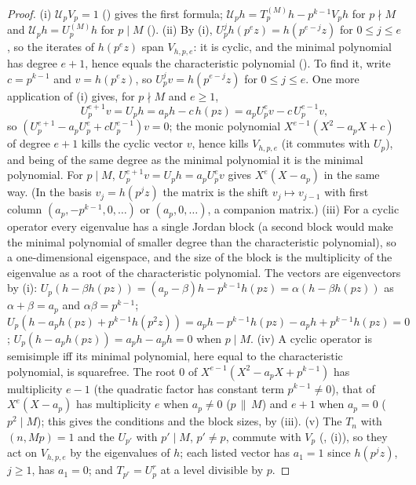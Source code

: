 \begin{proof}
(i) $\mathcal U_pV_p=1$ () gives the first formula; $\mathcal U_ph=T_p^{(M)}h-p^{k-1}V_ph$ for $p\nmid M$ and $\mathcal U_ph=U_p^{(M)}h$ for $p\mid M$ ().
(ii) By (i), $U_p^jh(p^ez)=h(p^{e-j}z)$ for $0\le j\le e$, so the iterates of $h(p^ez)$ span $V_{h,p,e}$: it is cyclic, and the minimal polynomial has degree $e+1$, hence equals the
characteristic polynomial (). To find it, write $c=p^{k-1}$ and $v=h(p^ez)$, so $U_p^jv=h(p^{e-j}z)$ for $0\le j\le e$. One more application of (i) gives, for
$p\nmid M$ and $e\ge1$,
\[
U_p^{e+1}v=U_ph=a_ph-c\,h(pz)=a_pU_p^ev-c\,U_p^{e-1}v,
\]
so $(U_p^{e+1}-a_pU_p^e+cU_p^{e-1})v=0$; the monic polynomial $X^{e-1}(X^2-a_pX+c)$ of degree $e+1$ kills the cyclic vector $v$, hence kills $V_{h,p,e}$ (it commutes with $U_p$), and
being of the same degree as the minimal polynomial it is the minimal polynomial. For $p\mid M$, $U_p^{e+1}v=U_ph=a_pU_p^ev$ gives $X^e(X-a_p)$ in the same way. (In the basis
$v_j=h(p^jz)$ the matrix is the shift $v_j\mapsto v_{j-1}$ with first column $(a_p,-p^{k-1},0,\dots)$ or $(a_p,0,\dots)$, a companion matrix.) (iii) For a cyclic operator every eigenvalue has a
single Jordan block (a second block would make the minimal polynomial of smaller degree than the characteristic polynomial), so a one-dimensional
eigenspace, and the size of the block is the multiplicity of the eigenvalue as a root of the characteristic polynomial. The vectors are eigenvectors by (i): $U_p(h-\beta h(pz))=(a_p-\beta)h-p^{k-1}h(pz)=\alpha(h-\beta h(pz))$ as $\alpha+\beta=a_p$ and $\alpha\beta=p^{k-1}$; $U_p(h-a_ph(pz)+p^{k-1}h(p^2z))=a_ph-p^{k-1}h(pz)-a_ph+p^{k-1}h(pz)=0$;
$U_p(h-a_ph(pz))=a_ph-a_ph=0$ when $p\mid M$. (iv) A cyclic operator is semisimple iff its minimal polynomial, here equal to the characteristic polynomial, is squarefree. The root $0$ of $X^{e-1}(X^2-a_pX+p^{k-1})$
has multiplicity $e-1$ (the quadratic factor has constant term $p^{k-1}\ne0$), that of $X^e(X-a_p)$ has multiplicity $e$ when $a_p\ne0$ ($p\,\|\,M$) and $e+1$ when $a_p=0$ ($p^2\mid M$);
this gives the conditions and the block sizes, by (iii). (v) The
$T_n$ with $(n,Mp)=1$ and the $U_{p'}$ with $p'\mid M$, $p'\ne p$, commute with $V_p$ (, (i)), so they act on $V_{h,p,e}$ by the eigenvalues of $h$; each
listed vector has $a_1=1$ since $h(p^jz)$, $j\ge1$, has $a_1=0$; and $T_{p^r}=U_p^r$ at a level divisible by $p$.
\end{proof}

